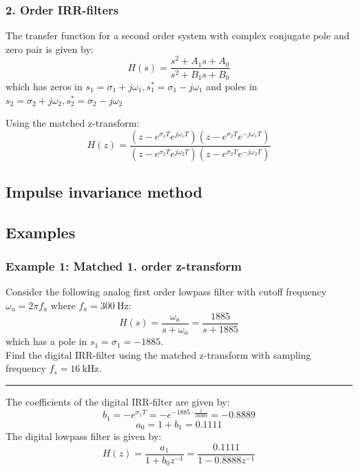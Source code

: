 \subsubsection{2. Order IRR-filters}
The transfer function for a second order system with complex conjugate pole and zero pair is given by:
$$H(s)={\frac{s^{2}+A_{1}s+A_{0}}{s^{2}+B_{1}s+B_{0}}}$$
which has zeros in $s_1=\sigma_1+j\omega_1,s_1^*=\sigma_1-j\omega_1$ and poles in $s_2=\sigma_2+j\omega_2,s_2^*=\sigma_2-j\omega_2$

Using the matched z-transform:
$$H(z)={\frac{(z-e^{\sigma_{1}T}e^{j\omega_{1}T})(z-e^{\sigma_{2}T}e^{-j\omega_{1}T})}{(z-e^{\sigma_{2}T}e^{j\omega_{2}T})(z-e^{\sigma_{2}T}e^{-j\omega_{2}T})}}$$
\subsection{Impulse invariance method}

\subsection{Examples}
\subsubsection{Example 1: Matched 1. order z-transform}
Consider the following analog first order lowpass filter with cutoff frequency $\omega_a=2\pi f_a$ where $f_a=\SI{300}{\hertz}$:
$$H(s)=\frac{\omega_a}{s+\omega_a}=\frac{1885}{s+1885}$$
which has a pole in $s_1=\sigma_1=-1885$.\\
Find the digital IRR-filter using the matched z-transform with sampling frequency $f_s=\SI{16}{\kilo\hertz}$.

\noindent\rule{\textwidth}{1pt}

The coefficients of the digital IRR-filter are given by:
$$b_1=-e^{\sigma_1 T}=-e^{-1885\cdot\frac{1}{16000}}=-0.8889$$
$$a_0=1+b_1=0.1111$$
The digital lowpass filter is given by:
$$H(z)=\frac{a_1}{1+b_0z^{-1}}=\frac{0.1111}{1-0.8888z^{-1}}$$
